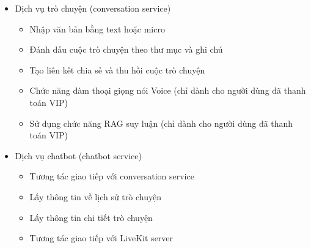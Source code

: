 \begin{itemize}

\item Dịch vụ trò chuyện (conversation service)

\begin{itemize}

\item Nhập văn bản bằng text hoặc micro
\item Đánh dấu cuộc trò chuyện theo thư mục và ghi chú
\item Tạo liên kết chia sẻ và thu hồi cuộc trò chuyện
\item Chức năng đàm thoại giọng nói Voice (chỉ dành cho người dùng đã thanh toán VIP)
\item Sử dụng chức năng RAG suy luận (chỉ dành cho người dùng đã thanh toán VIP)
\end{itemize}

\item Dịch vụ chatbot (chatbot service)

\begin{itemize}

\item Tương tác giao tiếp với conversation service
\item Lấy thông tin về lịch sử trò chuyện
\item Lấy thông tin chi tiết trò chuyện
\item Tương tác giao tiếp với LiveKit server
\end{itemize}

\end{itemize}
